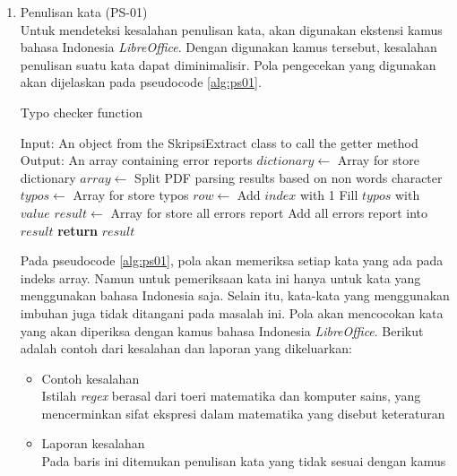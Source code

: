 \begin{enumerate}
	\item Penulisan kata (PS-01) \\
	Untuk mendeteksi kesalahan penulisan kata, akan digunakan ekstensi kamus bahasa Indonesia \textit{LibreOffice}. Dengan digunakan kamus tersebut, kesalahan penulisan suatu kata dapat diminimalisir. Pola pengecekan yang digunakan akan dijelaskan pada pseudocode \ref{alg:ps01}.
		
\begin{minipage}{1.0\linewidth}
\begin{algorithm}[H]
    \caption{Typo checker function}
	\label{alg:ps01}
	\begin{algorithmic}[1]
    		\State Input: An object from the SkripsiExtract class to call the getter method
			\State Output: An array containing error reports
			\State $dictionary \gets$ Array for store dictionary
			\State $array \gets$ Split PDF parsing results based on non words character
			\State $typos \gets$ Array for store typos
    			\State $row \gets$ Add $index$ with 1
                	\State Fill $typos$ with $value$
            	\EndIf
        	\EndFor
			\State $result \gets$ Array for store all errors report
                \State Add all errors report into $result$
            \EndIf
    		\State \textbf{return} $result$
    	\EndFunction
	\end{algorithmic}
\end{algorithm}
\end{minipage}
\medskip

	Pada pseudocode \ref{alg:ps01}, pola akan memeriksa setiap kata yang ada pada indeks array. Namun untuk pemeriksaan kata ini hanya untuk kata yang menggunakan bahasa Indonesia saja. Selain itu, kata-kata yang menggunakan imbuhan juga tidak ditangani pada masalah ini. Pola akan mencocokan kata yang akan diperiksa dengan kamus bahasa Indonesia \textit{LibreOffice}. Berikut adalah contoh dari kesalahan dan laporan yang dikeluarkan:
	
	\begin{itemize}
		\item Contoh kesalahan \\
		Istilah \textit{regex} berasal dari toeri matematika dan komputer sains, yang mencerminkan sifat ekspresi dalam matematika yang disebut keteraturan
		\item Laporan kesalahan \\
		Pada baris ini ditemukan penulisan kata yang tidak sesuai dengan kamus
	\end{itemize}
	

\end{enumerate}

